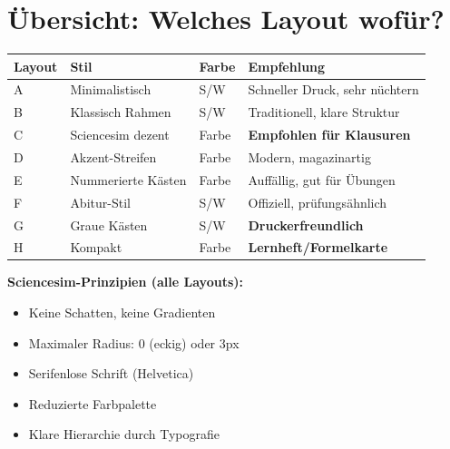 \documentclass[11pt,a4paper]{article}
\begin{document}
\vspace{1cm}

\newpage
\section*{Übersicht: Welches Layout wofür?}

\vspace{0.5cm}

\begin{tabular}{|l|l|l|l|}
\hline
\textbf{Layout} & \textbf{Stil} & \textbf{Farbe} & \textbf{Empfehlung} \\
\hline
A & Minimalistisch & S/W & Schneller Druck, sehr nüchtern \\
\hline
B & Klassisch Rahmen & S/W & Traditionell, klare Struktur \\
\hline
C & Sciencesim dezent & Farbe & \textbf{Empfohlen für Klausuren} \\
\hline
D & Akzent-Streifen & Farbe & Modern, magazinartig \\
\hline
E & Nummerierte Kästen & Farbe & Auffällig, gut für Übungen \\
\hline
F & Abitur-Stil & S/W & Offiziell, prüfungsähnlich \\
\hline
G & Graue Kästen & S/W & \textbf{Druckerfreundlich} \\
\hline
H & Kompakt & Farbe & \textbf{Lernheft/Formelkarte} \\
\hline
\end{tabular}

\vspace{1cm}

\textbf{Sciencesim-Prinzipien (alle Layouts):}
\begin{itemize}
\item Keine Schatten, keine Gradienten
\item Maximaler Radius: 0 (eckig) oder 3px
\item Serifenlose Schrift (Helvetica)
\item Reduzierte Farbpalette
\item Klare Hierarchie durch Typografie
\end{itemize}
\end{document}
